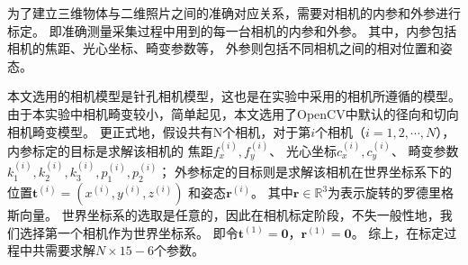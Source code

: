 \documentclass{ctexart}
\begin{document}
为了建立三维物体与二维照片之间的准确对应关系，需要对相机的内参和外参进行标定。
即准确测量采集过程中用到的每一台相机的内参和外参。
其中，内参包括相机的焦距、光心坐标、畸变参数等，
外参则包括不同相机之间的相对位置和姿态。

本文选用的相机模型是针孔相机模型，这也是在实验中采用的相机所遵循的模型。
由于本实验中相机畸变较小，简单起见，本文选用了OpenCV中默认的径向和切向相机畸变模型\cite{?}。
更正式地，假设共有N个相机，对于第$i$个相机（$i=1,2,\cdots,N$），
内参标定的目标是求解该相机的
焦距$f_x^{(i)},f_y^{(i)}$、
光心坐标$c_x^{(i)},c_y^{(i)}$、
畸变参数$k_1^{(i)},k_2^{(i)},k_3^{(i)},p_1^{(i)},p_2^{(i)}$；
外参标定的目标则是求解该相机在世界坐标系下的
位置$\mathbf{t}^{(i)}=\left(x^{(i)},y^{(i)},z^{(i)}\right)$
和姿态$\mathbf{r}^{(i)}$。
其中$\mathbf{r}\in \mathbb{R}^3$为表示旋转的罗德里格斯向量\cite{?}。
世界坐标系的选取是任意的，因此在相机标定阶段，不失一般性地，我们选择第一个相机作为世界坐标系。
即令$\mathbf{t}^{(1)}=\mathbf{0}$，$\mathbf{r}^{(1)}=\mathbf{0}$。
综上，在标定过程中共需要求解$N\times 15 - 6$个参数。
\end{document}
